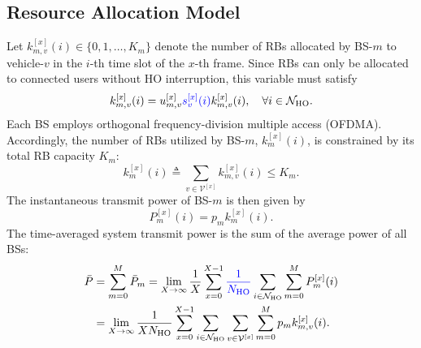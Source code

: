 \documentclass[conference, a4paper]{IEEEtran}
\newcommand{\rev}[1]{\textcolor{revisioncolor}{{}#1}}
\theoremstyle{remark}
\begin{document}
\subsection{Resource Allocation Model}

Let $k_{m,v}^{[x]}(i) \in \{0,1,\dots,K_m\}$ denote the number of RBs allocated by BS-$m$ to vehicle-$v$ in the $i$-th time slot of the $x$-th frame. Since RBs can only be allocated to connected users\rev{ without HO interruption}, this variable must satisfy
\begin{equation}
    k_{m,v}^{[x]}(i) = u_{m,v}^{[x]}\rev{s_v^{[x]}(i)}k_{m,v}^{[x]}(i), \quad \forall i \in \mathcal{N}_{\rm HO}.
    \label{eq:resource allocation cons}
\end{equation}
Each BS employs orthogonal frequency-division multiple access (OFDMA). Accordingly, the number of RBs utilized by BS-$m$, $k_{m}^{[x]}(i)$, is constrained by its total RB capacity $K_m$:
\begin{equation}
    k_{m}^{[x]}(i) \triangleq \sum_{v\in\mathcal{V}^{[x]}} k_{m,v}^{[x]}(i) \leq K_m.
    \label{eq:RB cons}
\end{equation}
The instantaneous transmit power of BS-$m$ is then given by
\begin{equation}
    P_m^{[x]}(i) = p_m k_{m}^{[x]}(i).
    \label{eq:BS instant power cons}
\end{equation}
The time-averaged system transmit power is the sum of the average power of all BSs:
\begin{align}
    \bar{P} & = \sum_{m=0}^M \bar{P}_m =\lim_{X\to\infty}\frac{1}{X} \sum_{x=0}^{X-1}\rev{\frac{1}{N_{\rm HO}}}\sum_{i \in \mathcal{N}_{\rm HO}} \sum_{m=0}^MP_m^{[x]}(i) \nonumber \\
    &=\lim_{X\to\infty}\frac{1}{XN_{\rm HO}}\sum_{x=0}^{X-1}\sum_{i \in \mathcal{N}_{\rm HO}}  \sum_{v\in\mathcal{V}^{[x]}} \sum_{m=0}^M p_m  k_{m,v}^{[x]}(i).
    \label{eq:area timeavg power cons}
\end{align}
\end{document}
